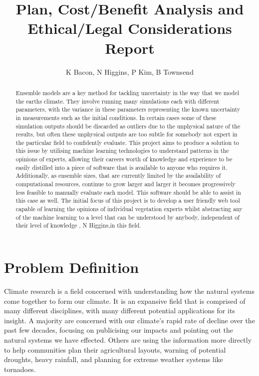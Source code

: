 \documentclass{ecmm427_assignment}
\begin{document}
\tableofcontents

\title{Plan, Cost/Benefit Analysis and Ethical/Legal Considerations Report}
\author{K Bacon, N Higgins, P Kim, B Townsend}
\maketitle

\begin{abstract}
Ensemble models are a key method for tackling uncertainty in the way that we model the earths climate. They involve running many simulations each with different parameters, with the variance in these parameters representing the known uncertainty in measurements such as the initial conditions. In certain cases some of these simulation outputs should be discarded as outliers due to the unphysical nature of the results, but often these unphysical outputs are too subtle for somebody not expert in the particular field to confidently evaluate. This project aims to produce a solution to this issue by utilising machine learning technologies to understand patterns in the opinions of experts, allowing their careers worth of knowledge and experience to be easily distilled into a piece of software that is available to anyone who requires it. Additionally, as ensemble sizes, that are currently limited by the availability of computational resources, continue to grow larger and larger it becomes progressively less feasible to manually evaluate each model. This software should be able to assist in this case as well. The initial focus of this project is to develop a user friendly web tool capable of learning the opinions of individual vegetation experts whilst abstracting any of the machine learning to a level that can be understood by anybody, independent of their level of knowledge , N Higgins,in this field. 
\end{abstract}

\declaration
\newpage %

\section{Problem Definition}

Climate research is a field concerned with understanding how the natural systems come together to form our climate. It is an expansive field that is comprised of many different disciplines, with many different potential applications for its insight. A majority are concerned with our climate's rapid rate of decline over the past few decades, focusing on publicising our impacts and pointing out the natural systems we have effected. Others are using the information more directly to help communities plan their agricultural layouts, warning of potential droughts, heavy rainfall, and planning for extreme weather systems like tornadoes.
\end{document}
